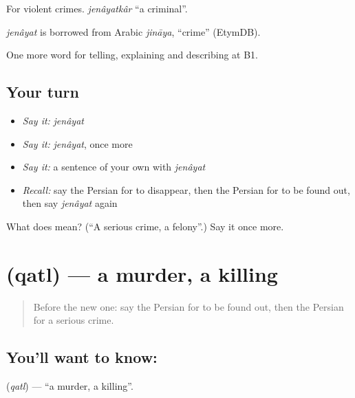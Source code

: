 For violent crimes. \emph{jenâyatkâr} \textquotedblleft{}a criminal\textquotedblright{}.

\begin{cousinweb}
\emph{jenâyat} is borrowed from Arabic \emph{jināya}, \textquotedblleft{}crime\textquotedblright{} (EtymDB).
\end{cousinweb}

\begin{grammarlens}[title={What you've built}]
One more word for telling, explaining and describing at B1.
\end{grammarlens}

\subsection*{Your turn}
\begin{itemize}
\raggedright
  \item \emph{Say it:} \emph{jenâyat}
  \item \emph{Say it:} \emph{jenâyat}, once more
  \item \emph{Say it:} a sentence of your own with \emph{jenâyat}
  \item \emph{Recall:} say the Persian for to disappear, then the Persian for to be found out, then say \emph{jenâyat} again
\end{itemize}

\begin{tcolorbox}[breakable,colback=teal!4,colframe=teal!35!black,title={Before you move on}]
What does  mean? (\textquotedblleft{}A serious crime, a felony\textquotedblright{}.) Say it once more.
\end{tcolorbox}
\section[\texorpdfstring{\fa{قتل} (qatl)}{قتل (qatl)}]{ (qatl) — a murder, a killing}

\label{lesson:FA-C318-qatl}



\begin{quote}
Before the new one: say the Persian for to be found out, then the Persian for a serious crime.
\end{quote}

\subsection*{You'll want to know: }
\textbf{} (\emph{qatl}) — \textquotedblleft{}a murder, a killing\textquotedblright{}.

